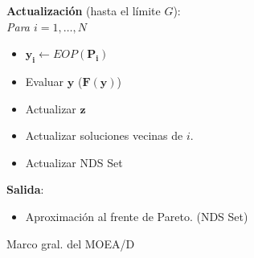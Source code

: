 \begin{minipage}[H]{0.47\linewidth}
\begin{algorithm}[H]
\vspace{0.3cm}
  
 \textbf{Actualización} (hasta el límite $G$):\\
    \textit{Para $i=1, \dots, N$}
        \begin{itemize}
            \vspace{0.15cm}\item $\boldsymbol{y_i} \gets EOP(\boldsymbol{P_i})$
            
            \vspace{0.15cm}\item Evaluar $\boldsymbol{y}$ ($\boldsymbol{F}(\boldsymbol{y})$)
            \vspace{0.15cm}\item Actualizar $\boldsymbol{z}$
            \vspace{0.15cm}\item Actualizar soluciones vecinas de $i$.
            \vspace{0.15cm}\item Actualizar NDS Set
        \end{itemize}
    
     
    \vspace{0.3cm} 
    
    \textbf{Salida}:
    \begin{itemize}
        \item Aproximación al frente de Pareto. (NDS Set)
    \end{itemize}
 \caption{Marco gral. del MOEA/D}
 \label{alg:1}
\end{algorithm}
\end{minipage}\\

